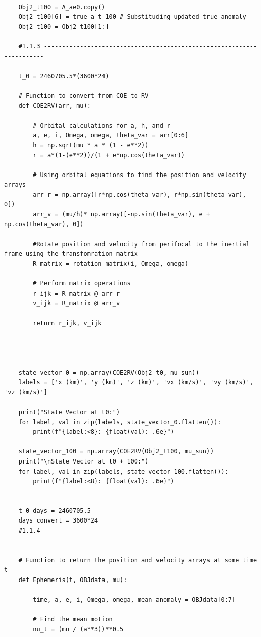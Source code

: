 \documentclass[12pt,twocolumn]{article}  %
\begin{document}
\begin{lstlisting}
    
    Obj2_t100 = A_ae0.copy()
    Obj2_t100[6] = true_a_t_100 # Substituding updated true anomaly
    Obj2_t100 = Obj2_t100[1:]
    
    #1.1.3 ----------------------------------------------------------------------
    
    t_0 = 2460705.5*(3600*24)
    
    # Function to convert from COE to RV
    def COE2RV(arr, mu):
        
        # Orbital calculations for a, h, and r
        a, e, i, Omega, omega, theta_var = arr[0:6]
        h = np.sqrt(mu * a * (1 - e**2))
        r = a*(1-(e**2))/(1 + e*np.cos(theta_var))
        
        # Using orbital equations to find the position and velocity arrays
        arr_r = np.array([r*np.cos(theta_var), r*np.sin(theta_var), 0])
        arr_v = (mu/h)* np.array([-np.sin(theta_var), e + np.cos(theta_var), 0])
    
        #Rotate position and velocity from perifocal to the inertial frame using the transfomration matrix
        R_matrix = rotation_matrix(i, Omega, omega)
       
        # Perform matrix operations
        r_ijk = R_matrix @ arr_r
        v_ijk = R_matrix @ arr_v
        
        return r_ijk, v_ijk
    
    
    
    
    state_vector_0 = np.array(COE2RV(Obj2_t0, mu_sun))
    labels = ['x (km)', 'y (km)', 'z (km)', 'vx (km/s)', 'vy (km/s)', 'vz (km/s)']
    
    print("State Vector at t0:")
    for label, val in zip(labels, state_vector_0.flatten()):
        print(f"{label:<8}: {float(val): .6e}")
    
    state_vector_100 = np.array(COE2RV(Obj2_t100, mu_sun))
    print("\nState Vector at t0 + 100:")
    for label, val in zip(labels, state_vector_100.flatten()):
        print(f"{label:<8}: {float(val): .6e}")
    
    
    t_0_days = 2460705.5
    days_convert = 3600*24
    #1.1.4 ----------------------------------------------------------------------
    
    # Function to return the position and velocity arrays at some time t
    def Ephemeris(t, OBJdata, mu):
    
        time, a, e, i, Omega, omega, mean_anomaly = OBJdata[0:7]
        
        # Find the mean motion
        nu_t = (mu / (a**3))**0.5
        

\end{lstlisting}
\end{document}
